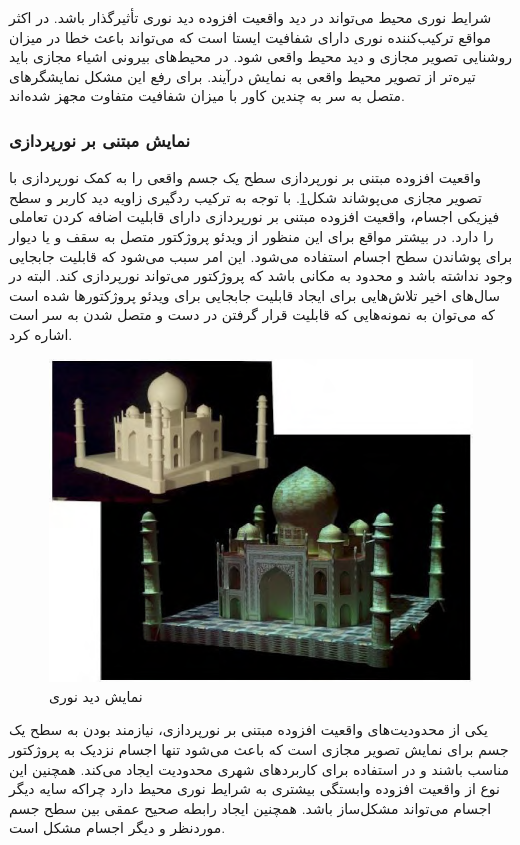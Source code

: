 شرایط نوری محیط می‌تواند در دید واقعیت افزوده دید نوری تأثیرگذار باشد. در اکثر مواقع ترکیب‌کننده نوری دارای شفافیت ایستا است که می‌تواند باعث خطا در میزان روشنایی تصویر مجازی و دید محیط واقعی شود. در محیط‌های بیرونی اشیاء مجازی باید تیره‌تر از تصویر محیط واقعی به نمایش درآیند. برای رفع این مشکل نمایشگرهای متصل به سر به چندین کاور با میزان شفافیت متفاوت مجهز شده‌اند.
\subsubsection{نمایش مبتنی بر نورپردازی}
واقعیت افزوده مبتنی بر نورپردازی سطح یک جسم واقعی را به کمک نورپردازی با تصویر مجازی می‌پوشاند شکل\ref{fig:tajmahal}. با توجه به ترکیب ردگیری زاویه دید کاربر و سطح فیزیکی اجسام، واقعیت افزوده مبتنی بر نورپردازی دارای قابلیت اضافه کردن تعاملی را دارد\cite{Raskar}. در بیشتر مواقع برای این منظور از ویدئو پروژکتور متصل به سقف و یا دیوار برای پوشاندن سطح اجسام استفاده می‌شود. این امر سبب می‌شود که قابلیت جابجایی وجود نداشته باشد و محدود به مکانی باشد که پروژکتور می‌تواند نورپردازی کند. البته در سال‌های اخیر تلاش‌هایی برای ایجاد قابلیت جابجایی برای ویدئو پروژکتورها شده است که می‌توان به نمونه‌هایی که قابلیت قرار گرفتن در دست\cite{Mistry} و متصل شدن به سر است\cite{krum2012augmented} اشاره کرد.

\begin{figure}
	\centering
	\includegraphics[width=1\linewidth]{image/tajmahal}
	\caption {نمایش دید نوری \cite{Mistry}}
	\label{fig:tajmahal}
\end{figure}

یکی از محدودیت‌های واقعیت افزوده مبتنی بر نورپردازی، نیازمند بودن به سطح یک جسم برای نمایش تصویر مجازی است که باعث می‌شود تنها اجسام نزدیک به پروژکتور مناسب باشند و در استفاده برای کاربردهای شهری محدودیت ایجاد می‌کند. همچنین این نوع از واقعیت افزوده وابستگی بیشتری به شرایط نوری محیط دارد چراکه سایه دیگر اجسام می‌تواند مشکل‌ساز باشد. همچنین ایجاد رابطه صحیح عمقی بین سطح جسم موردنظر و دیگر اجسام مشکل است.

